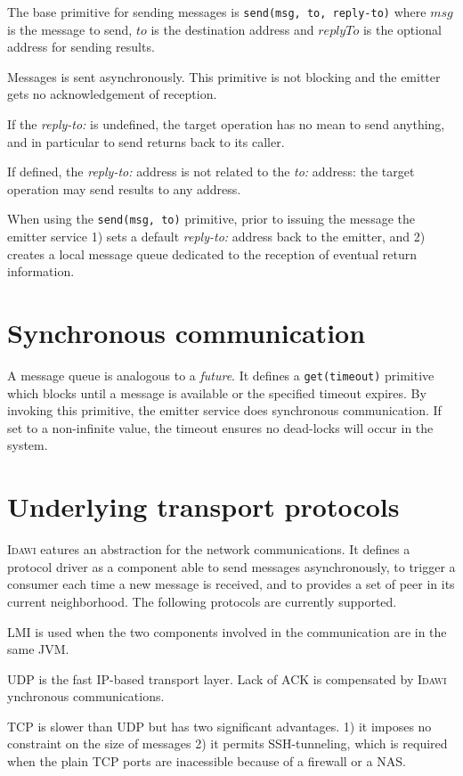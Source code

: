 \documentclass{article}
\newcommand{\idawi}[1]{\textsc{Idawi}\xspace}
\begin{document}
The base primitive for sending messages is
\texttt{send(msg, to, reply-to)}
where $msg$ is the message to send, $to$ is the destination address and $replyTo$ is the optional address for sending results.

Messages is sent asynchronously. This primitive is not blocking and the emitter gets no acknowledgement of reception.

If the {\em reply-to:} is undefined, the target operation has no mean to send anything, and in particular to send returns back to its caller.


If defined, the {\em reply-to:} address is not related to the {\em to:} address: the target operation may send results to any address.

When using the \texttt{send(msg, to)} primitive, prior to issuing the message the emitter service 1) sets a default {\em reply-to:} address back to the emitter, and 2)
creates a local message queue dedicated to the reception of eventual return information.

\section{Synchronous communication}
A message queue is analogous to a {\em future}. It defines a \texttt{get(timeout)} primitive which blocks until a message is available or the specified timeout expires. By invoking this primitive, the emitter service does synchronous communication. If set to a non-infinite value, the timeout ensures no dead-locks will occur in the system.


\section{Underlying transport protocols}
\idawi features an abstraction for the network communications. It defines a protocol driver as a component able to send messages asynchronously, to trigger a consumer each time a new message is received, and to provides a set of peer in its current neighborhood.
The following protocols are currently supported.

LMI is used when the two components involved in the communication are in the same JVM.

UDP
is the fast IP-based transport layer. Lack of ACK is compensated by \idawi synchronous communications.

TCP
is slower than UDP but has two significant advantages. 1) it imposes no constraint on the size of messages 2) it permits SSH-tunneling, which is required when the plain TCP ports are inacessible because of a firewall or a NAS.
\end{document}
